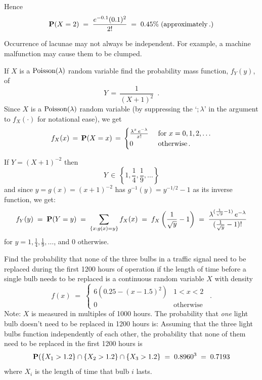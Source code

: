 \begin{ExerciseList}
Hence \[\mathbf{P}( X=2 )\;=\;   \frac{e^{-0.1} (0.1)^2}{2!}  \;=\;0.45\% \;
(\text{approximately}\,.) \]

\item Occurrence of lacunae may not always be independent. For example, a machine malfunction may cause them to be clumped.
\ee

\Exercise
If $X$ is a $\mbox{{\rm Poisson}}(\lambda)$ random variable find the probability mass function,  $f_Y (y)$, of
\[
Y\,=\,\frac{1}{(X+1)^{2}} \enspace .
\]
\Answer
Since $X$ is a $\mbox{{\rm Poisson}}(\lambda)$ random variable (by suppressing the `$;\lambda$' in the argument to $f_X(\cdot)$ for notational ease), we get
\[ f_X(x) \,=\, \mathbf{P}(X=x)\,=\, 
\begin{cases}
\frac{\lambda^x \, e^{-\lambda} }{ x!} & \text{ for }  x= 0, 1, 2, \dots \\
0 & \text{ otherwise} \,.
\end{cases}
\]

If $Y=(X+1)^{-2}$ then  \[Y \,\in\, \left\{1, \frac{1}{4}, \frac{1}{9}, \dots \right\} \]
and since $y=g(x)=(x+1)^{-2}$ has $g^{-1}(y)=y^{-1/2}-1$ as its inverse function, we get:
\[
f_Y(y)\;=\; \mathbf{P}(Y=y)\;=\; \sum_{\{ x: g(x)=y\}}f_X(x)  \;=\; f_X\left( \frac{1}{\sqrt y}-1\right) \;=\; \frac{\lambda^{(\frac{1}{\sqrt y} -1)} \, e^{-\lambda}}{(\frac{1}{\sqrt y} -1)!}
\]
for $y = 1, \frac{1}{4}, \frac{1}{9}, \dots $, and $0$ otherwise.

\Exercise
Find the probability that none of the three bulbs in a traffic signal need to be replaced during the first 1200 hours of operation if the length of time before a single bulb needs to  be replaced is a continuous random variable $X$ with density
$$f(x)\;=\;\begin{cases}6\left(0.25-(x-1.5)^2\right)&1<x<2\\0&\textrm{otherwise}\end{cases}\enspace.$$
Note: $X$ is measured in multiples of 1000 hours.
\Answer
The probability that  \emph{one}  light bulb doesn't need to be replaced in  1200 hours is:
Assuming  that   the three light bulbs function  independently of  each
other, the probability that none of them need to be replaced in the
first 1200 hours is
$$\mathbf{P}(\{X_1>1.2\}\cap\{X_2>1.2\}\cap\{X_3>1.2\}\;=\;0.8960^3\;=\;
0.7193$$
where $X_i$ is the length of time that bulb $i$ lasts.


\end{ExerciseList}
